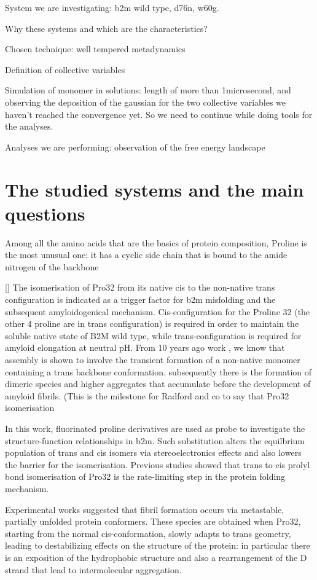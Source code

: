 System we are investigating: b2m wild type, d76n, w60g.

Why these systems and which are the characteristics?

Chosen technique: well tempered metadynamics

Definition of collective variables

Simulation of monomer in solutions: length of more than 1microsecond, and observing the deposition of the gaussian for the two collective variables we haven't reached the convergence yet. So we need to continue while doing tools for the analyses.

Analyses we are performing:
observation of the free energy landscape 


\section{The studied systems and the main questions}
Among all the amino acids that are the basics of protein composition, Proline is the most unusual one: it has a cyclic side chain that is bound to the amide nitrogen of the backbone  

[\cite{assembly}]
The isomerisation of Pro32 from its native cis to the non-native trans configuration is indicated as a trigger factor for b2m misfolding and the subsequent amyloidogenical mechanism.
Cis-configuration for the Proline 32 (the other 4 proline are in trans configuration) is required in order to maintain the soluble native state of B2M wild type, while trans-configuration is required for amyloid elongation at neutral pH. From 10 years ago work \cite{sciencedirect} , we know that assembly is shown to involve the transient formation of a non-native monomer containing a trans backbone conformation. subsequently there is the formation of dimeric species and higher aggregates that accumulate before the development of amyloid fibrils. (This is the milestone for Radford and co to say that Pro32 isomerisation

In this work, fluorinated proline derivatives are used as probe to investigate the structure-function relationships in b2m. Such substitution alters the equilbrium population of trans and cis isomers via stereoelectronics effects and also lowers the barrier for the isomerisation.
Previous studies showed that trans to cis prolyl bond isomerisation of Pro32 is the rate-limiting step in the protein folding mechanism.

Experimental works suggested that fibril formation occurs via metastable, partially unfolded protein conformers. These species are obtained when Pro32, starting from the normal cis-conformation, slowly adapts to trans geometry, leading to destabilizing effects on the structure of the protein: in particular there is an exposition of the hydrophobic structure and also a rearrangement of the D strand that lead to intermolecular aggregation. 